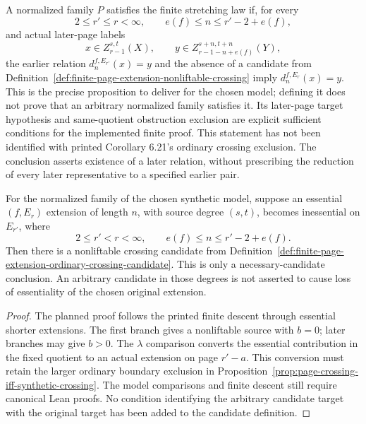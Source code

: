 \begin{definition}
  \label{def:finite-page-extension-stretching-law}
  \leanok
  A normalized family $P$ satisfies the finite stretching law if, for every
  \[
    2\le r'\le r<\infty,\qquad e(f)\le n\le r'-2+e(f),
  \]
  and actual later-page labels
  \[
    x\in Z_{r-1}^{s,t}(X),\qquad
    y\in Z_{r-1-n+e(f)}^{s+n,t+n}(Y),
  \]
  the earlier relation $d_n^{f,E_{r'}}(x)=y$ and the absence of a candidate
  from Definition~\ref{def:finite-page-extension-nonliftable-crossing}
  imply $d_n^{f,E_r}(x)=y$.
  This is the precise proposition to deliver for the chosen model; defining
  it does not prove that an arbitrary normalized family satisfies it.
  Its later-page target hypothesis and same-quotient obstruction exclusion
  are explicit sufficient conditions for the implemented finite proof.
  This statement has not been identified with printed Corollary 6.21's
  ordinary crossing exclusion.
  The conclusion asserts existence of a later relation, without prescribing
  the reduction of every later representative to a specified earlier pair.
\end{definition}

\begin{proposition}
  \label{prop:page-extension-loss-certificate}
  \notready
  For the normalized family of the chosen synthetic model, suppose an
  essential $(f,E_r)$ extension of length $n$, with source degree $(s,t)$,
  becomes inessential on $E_{r'}$, where
  \[
    2\le r'<r<\infty,\qquad e(f)\le n\le r'-2+e(f).
  \]
  Then there is a nonliftable crossing candidate from
  Definition~\ref{def:finite-page-extension-ordinary-crossing-candidate}.
  This is only a necessary-candidate conclusion.  An arbitrary candidate
  in those degrees is not asserted to cause loss of essentiality of the
  chosen original extension.
\end{proposition}

\begin{proof}
  The planned proof follows the printed finite descent through essential
  shorter extensions.  The first branch gives a nonliftable source with
  $b=0$; later branches may give $b>0$.  The $\lambda$ comparison converts
  the essential contribution in the fixed quotient to an actual extension
  on page $r'-a$.  This conversion must retain the larger ordinary
  boundary exclusion in
  Proposition~\ref{prop:page-crossing-iff-synthetic-crossing}.
  The model comparisons and finite descent still require canonical Lean
  proofs.  No condition identifying the arbitrary candidate target with
  the original target has been added to the candidate definition.
\end{proof}

